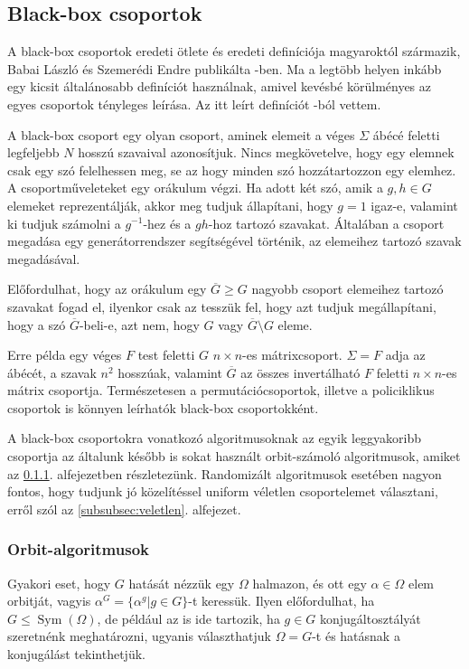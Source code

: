 \subsection{Black-box csoportok}
\label{subsec:blackbox}
A black-box csoportok eredeti ötlete és eredeti definíciója magyaroktól származik,
Babai László és Szemerédi Endre publikálta \cite{BS84}-ben.
Ma a legtöbb helyen inkább egy kicsit általánosabb definíciót használnak, amivel kevésbé körülményes az
egyes csoportok tényleges leírása. Az itt leírt definíciót \cite{Ser03}-ból vettem.

A black-box csoport egy olyan csoport,
aminek elemeit a véges $\Sigma$ ábécé feletti legfeljebb $N$ hosszú szavaival azonosítjuk.
Nincs megkövetelve, hogy egy elemnek csak egy szó felelhessen meg, se az hogy minden szó hozzátartozzon
egy elemhez.
A csoportműveleteket egy orákulum végzi.
Ha adott két szó, amik a $g, h\in G$ elemeket reprezentálják,
akkor meg tudjuk állapítani, hogy $g=1$ igaz-e,
valamint ki tudjuk számolni a $g^{-1}$-hez és a $gh$-hoz tartozó szavakat.
Általában a csoport megadása egy generátorrendszer segítségével történik, az elemeihez tartozó szavak megadásával.

Előfordulhat, hogy az orákulum egy $\overline{G} \ge G$ nagyobb csoport elemeihez tartozó szavakat fogad el,
ilyenkor csak az tesszük fel, hogy azt tudjuk megállapítani, hogy a szó $\overline{G}$-beli-e,
azt nem, hogy $G$ vagy $\overline{G}\setminus G$ eleme.

Erre példa egy véges $F$ test feletti $G$ $n\times n$-es mátrixcsoport.
$\Sigma=F$ adja az ábécét, a szavak $n^2$ hosszúak,
valamint $\overline{G}$ az összes invertálható $F$ feletti $n\times n$-es mátrix csoportja.
Természetesen a permutációcsoportok, illetve a policiklikus csoportok is könnyen leírhatók black-box csoportokként.

A black-box csoportokra vonatkozó algoritmusoknak az egyik leggyakoribb csoportja az általunk később is sokat használt
orbit-számoló algoritmusok, amiket az \ref{subsubsec:orbit}. alfejezetben részletezünk.
Randomizált algoritmusok esetében nagyon fontos, hogy tudjunk jó közelítéssel uniform véletlen csoportelemet választani,
erről szól az \ref{subsubsec:veletlen}. alfejezet.

\subsubsection{Orbit-algoritmusok}
\label{subsubsec:orbit}
Gyakori eset, hogy $G$ hatását nézzük egy $\Omega$ halmazon, és ott egy $\alpha\in\Omega$ elem orbitját,
vagyis $\alpha^G = \{ \alpha^g | g \in G \}$-t keressük. Ilyen előfordulhat, ha $G \le \mathop{Sym}(\Omega)$,
de például az is ide tartozik, ha $g \in G$ konjugáltosztályát szeretnénk meghatározni, ugyanis választhatjuk
$\Omega=G$-t és hatásnak a konjugálást tekinthetjük.

